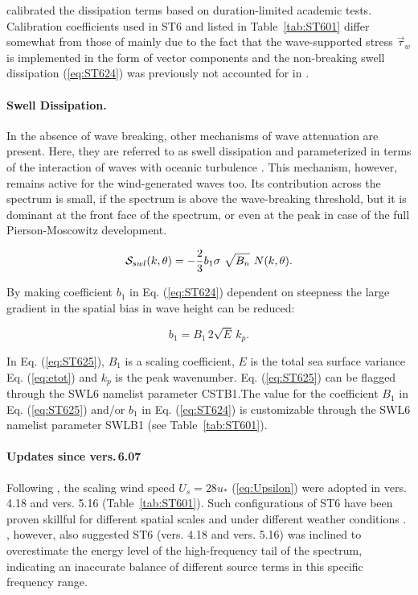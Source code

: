 \citet{art:RBW12} calibrated the dissipation terms based on duration-limited
academic tests. Calibration coefficients used in {\code ST6} and listed in
Table~\ref{tab:ST601} differ somewhat from those of \citet{art:RBW12}
mainly due to the fact that the wave-supported stress $\vec{\tau}_w$
is implemented in the form of vector components and the non-breaking swell
dissipation (\ref{eq:ST624}) was previously not accounted for in
\citet{art:RBW12}.

\paragraph{Swell Dissipation.} In the absence of wave breaking,
other mechanisms of wave attenuation are present. Here, they are
referred to as swell dissipation and parameterized in terms of
the interaction of waves with oceanic turbulence \citep{bk:Bab11}.
This mechanism, however, remains active for the wind-generated
waves too. Its contribution across the spectrum is small, if the
spectrum is above the wave-breaking threshold, but it is dominant
at the front face of the spectrum, or even at the peak in case of
the full Pierson-Moscowitz development.

\begin{equation}\label{eq:ST624}
  \cS_{swl}(k,\theta) = -\frac{2}{3}b_1 \sigma\ \sqrt{B_n}\ N(k,\theta).
\end{equation}

\noindent
By making coefficient $b_1$ in Eq. (\ref{eq:ST624}) dependent
on steepness the large gradient in the spatial bias in wave height
can be reduced:

\begin{equation}\label{eq:ST625}
   b_1 = B_1 \, 2\sqrt{E}\,k_p .
\end{equation}

In Eq. (\ref{eq:ST625}), $B_1$ is a scaling coefficient,
$E$  is the total sea surface variance Eq. (\ref{eq:etot}) and $k_p$
is the peak wavenumber.  Eq. (\ref{eq:ST625}) can be
flagged through the {\F SWL6} namelist parameter {\code CSTB1}.The value for the
coefficient $B_1$ in Eq. (\ref{eq:ST625}) and/or $b_1$ in Eq. (\ref{eq:ST624})
is customizable through the {\F SWL6} namelist parameter {\code SWLB1}
(see Table~\ref{tab:ST601}).

\noindent
\paragraph{Updates since vers.\,6.07} Following \citet{art:RBW12}, the
scaling wind speed $U_s = 28u_{\ast}$ (\ref{eq:Upsilon}) were adopted in
vers. 4.18 and vers. 5.16 (Table~\ref{tab:ST601}). Such configurations of {\code ST6} have been proven
skillful for different spatial scales and under different weather
conditions \citep[e.g.][]{art:ZBRY15, liu2017}. \citet[][their Fig. 5]{art:ZBRY15},
however, also suggested {\code ST6} (vers. 4.18 and vers. 5.16) was inclined to
overestimate the energy level of the high-frequency tail of the spectrum,
indicating an inaccurate balance of different source terms in this
specific frequency range.

